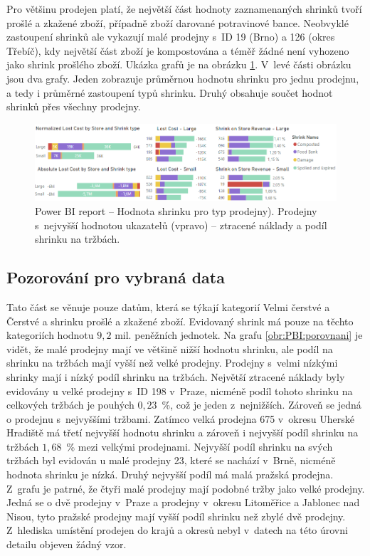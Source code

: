 Pro většinu prodejen platí, že největší část hodnoty zaznamenaných shrinků tvoří prošlé a zkažené zboží, případně zboží darované potravinové bance. Neobvyklé zastoupení shrinků ale vykazují malé prodejny s~ID 19 (Brno) a 126 (okres Třebíč), kdy největší část zboží je kompostována a téměř žádné není vyhozeno jako shrink prošlého zboží. Ukázka grafů je na obrázku \ref*{obr:PBI:topwhs}. V~levé části obrázku jsou dva grafy. Jeden zobrazuje průměrnou hodnotu shrinku pro jednu prodejnu, a tedy i průměrné zastoupení typů shrinku. Druhý obsahuje součet hodnot shrinků přes všechny prodejny.

\begin{figure}[h!]
    \centering
    \captionsetup{justification=centering}
    \includegraphics[width=\textwidth]{obrazky/PBI/topwhs.png}
    \caption{Power BI report -- Hodnota shrinku pro typ prodejny). Prodejny s~nejvyšší hodnotou ukazatelů (vpravo) -- ztracené náklady a podíl shrinku na tržbách.}
    \label{obr:PBI:topwhs}
\end{figure}

\subsection*{Pozorování pro vybraná data}

Tato část se věnuje pouze datům, která se týkají kategorií Velmi čerstvé a Čerstvé a shrinku prošlé a zkažené zboží. Evidovaný shrink má pouze na těchto kategoriích hodnotu $9{,}2$ mil. peněžních jednotek. 
Na grafu \ref*{obr:PBI:porovnani} je vidět, že malé prodejny mají ve většině nižší hodnotu shrinku, ale podíl na shrinku na tržbách mají vyšší než velké prodejny. Prodejny s~velmi nízkými shrinky mají i nízký podíl shrinku na tržbách. 
Největší ztracené náklady byly evidovány u velké prodejny s~ID 198 v~Praze, nicméně podíl tohoto shrinku na celkových tržbách je pouhých $0{,}23$~\%, což je jeden z~nejnižších. Zároveň se jedná o prodejnu s~nejvyššími tržbami. Zatímco velká prodejna 675 v~okresu Uherské Hradiště má třetí nejvyšší hodnotu shrinku a zároveň i nejvyšší podíl shrinku na tržbách $1{,}68$~\% mezi velkými prodejnami. 
Nejvyšší podíl shrinku na svých tržbách byl evidován u malé prodejny 23, které se nachází v~Brně, nicméně hodnota shrinku je nízká. Druhý nejvyšší podíl má malá pražská prodejna.
Z~grafu je patrné, že čtyři malé prodejny mají podobné tržby jako velké prodejny. Jedná se o dvě prodejny v~Praze a prodejny v~okresu Litoměřice a Jablonec nad Nisou, tyto pražské prodejny mají vyšší podíl shrinku než zbylé dvě prodejny.
Z~hlediska umístění prodejen do krajů a okresů nebyl v~datech na této úrovni detailu objeven žádný vzor.

